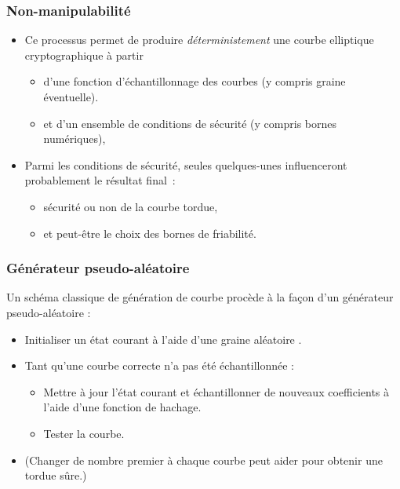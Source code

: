 \documentclass[francais]{beamer}
\begin{document}
\begin{frame}\frametitle{Non-manipulabilité}
\begin{itemize}
\item Ce processus permet de produire \emph{déterministement}
une courbe elliptique cryptographique à partir
\begin{itemize}
\item d'une fonction d'échantillonnage des courbes
(y compris graine éventuelle).
\item et d'un ensemble de conditions de sécurité (y compris bornes numériques),
\end{itemize}
\item Parmi les conditions de sécurité, seules quelques-unes
influenceront probablement le résultat final :
\begin{itemize}
\item sécurité ou non de la courbe tordue,
\item et peut-être le choix des bornes de friabilité.
\end{itemize}
\end{itemize}
\end{frame}

\begin{frame}\frametitle{Générateur pseudo-aléatoire}
Un schéma classique de génération de courbe procède à la façon d'un générateur pseudo-aléatoire :
\begin{itemize}
\item Initialiser un état courant à l'aide d'une graine \og aléatoire \fg.
\item Tant qu'une courbe correcte n'a pas été échantillonnée :
\begin{itemize}
\item Mettre à jour l'état courant et échantillonner de nouveaux coefficients à l'aide d'une fonction de hachage.
\item Tester la courbe.
\end{itemize}
\item (Changer de nombre premier à chaque courbe peut aider pour obtenir une tordue sûre.)
\end{itemize}
\end{frame}
\end{document}
